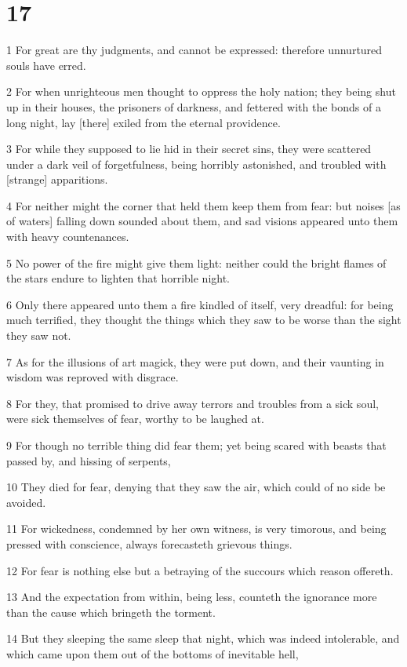 \chapter{17}

\par 1 For great are thy judgments, and cannot be expressed: therefore unnurtured souls have erred.
\par 2 For when unrighteous men thought to oppress the holy nation; they being shut up in their houses, the prisoners of darkness, and fettered with the bonds of a long night, lay [there] exiled from the eternal providence.
\par 3 For while they supposed to lie hid in their secret sins, they were scattered under a dark veil of forgetfulness, being horribly astonished, and troubled with [strange] apparitions.
\par 4 For neither might the corner that held them keep them from fear: but noises [as of waters] falling down sounded about them, and sad visions appeared unto them with heavy countenances.
\par 5 No power of the fire might give them light: neither could the bright flames of the stars endure to lighten that horrible night.
\par 6 Only there appeared unto them a fire kindled of itself, very dreadful: for being much terrified, they thought the things which they saw to be worse than the sight they saw not.
\par 7 As for the illusions of art magick, they were put down, and their vaunting in wisdom was reproved with disgrace.
\par 8 For they, that promised to drive away terrors and troubles from a sick soul, were sick themselves of fear, worthy to be laughed at.
\par 9 For though no terrible thing did fear them; yet being scared with beasts that passed by, and hissing of serpents,
\par 10 They died for fear, denying that they saw the air, which could of no side be avoided.
\par 11 For wickedness, condemned by her own witness, is very timorous, and being pressed with conscience, always forecasteth grievous things.
\par 12 For fear is nothing else but a betraying of the succours which reason offereth.
\par 13 And the expectation from within, being less, counteth the ignorance more than the cause which bringeth the torment.
\par 14 But they sleeping the same sleep that night, which was indeed intolerable, and which came upon them out of the bottoms of inevitable hell,
